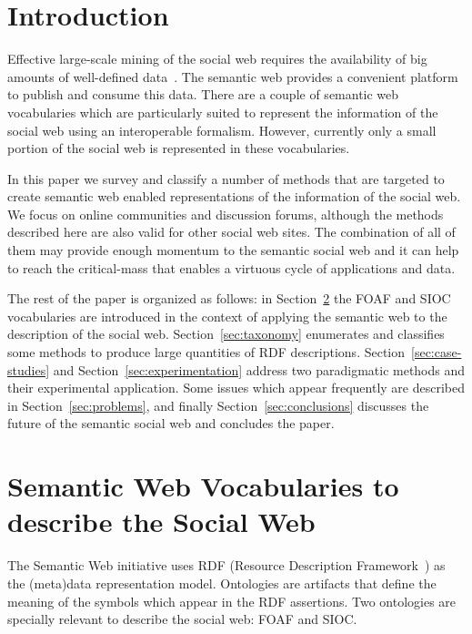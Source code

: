 \documentclass{../templates/www2008-submission}
\begin{document}

\section{Introduction}

Effective large-scale mining of the social web requires the
availability of big amounts of well-defined data~\cite{Mika2004}.
The semantic web provides a convenient platform to publish and
consume this data. There are a couple of semantic web vocabularies
which are particularly suited to represent the
information of the social web using an interoperable formalism.
However, currently only a small portion of the social web is
represented in these vocabularies.

In this paper we survey and classify a number of methods that
are targeted to create semantic web enabled representations of
the information of the social web. We focus on online communities
and discussion forums, although the methods described here are also valid
for other social web sites. The combination of all of them
may provide enough momentum to the semantic social
web and it can help to reach the critical-mass that
enables a virtuous cycle of applications and data.

The rest of the paper is organized as follows: in Section~\ref{sec:vocabularies}
the FOAF and SIOC vocabularies are introduced in the context of applying
the semantic web to the description of the social web. Section~\ref{sec:taxonomy}
enumerates and classifies some methods to produce large quantities
of RDF descriptions. Section~\ref{sec:case-studies} and
Section~\ref{sec:experimentation} address two paradigmatic methods
and their experimental application. Some issues which appear
frequently are described in Section~\ref{sec:problems}, and
finally Section~\ref{sec:conclusions} discusses the future of the
semantic social web and concludes the paper.


\section{Semantic Web Vocabularies to describe the Social Web}\label{sec:vocabularies}

The Semantic Web initiative uses RDF (Resource Description
Framework~\cite{RDF}) as the (meta)data representation model.
Ontologies are artifacts that define the meaning of the symbols
which appear in the RDF assertions. Two ontologies are
specially relevant to describe the social web: FOAF and SIOC.
\end{document}
